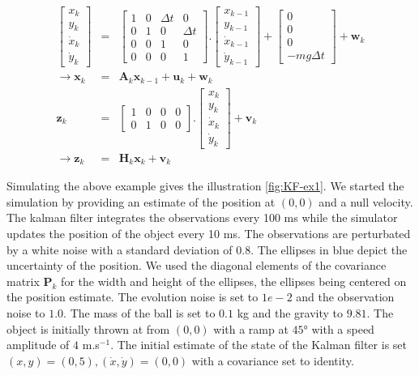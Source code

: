 \documentclass[10pt,oneside]{scrartcl}
\newcommand\vecteur[1]{\boldsymbol#1}
\newcommand\matrice[1]{\mathbf#1}
\begin{document}
\begin{eqnarray}
 \begin{bmatrix}
x_k \\
y_k\\
\dot{x}_k\\
\dot{y}_k
\end{bmatrix} &=& 
 \begin{bmatrix}
1 & 0 & \Delta t & 0        \\
0 & 1 & 0        & \Delta t \\
0 & 0 & 1        & 0 \\
0 & 0 & 0        & 1
\end{bmatrix} . 
 \begin{bmatrix}
x_{k-1} \\
y_{k-1}\\
\dot{x}_{k-1}\\
\dot{y}_{k-1}
\end{bmatrix} + 
 \begin{bmatrix}
0 \\
0\\
0\\
-m g \Delta t
\end{bmatrix} + \vecteur{w}_k \\
\rightarrow \vecteur{x}_k &=& \matrice{A}_k \vecteur{x}_{k-1} + \vecteur{u}_k + \vecteur{w}_k\\
\vecteur{z}_k
&=& \begin{bmatrix}
1 & 0 & 0 & 0 \\
0 & 1 & 0 & 0 
\end{bmatrix}.
\begin{bmatrix}
x_k \\
y_k\\
\dot{x}_k\\
\dot{y}_k
\end{bmatrix} + \vecteur{v}_k\\
\rightarrow \vecteur{z}_k &=& \matrice{H}_k \vecteur{x}_k + \vecteur{v}_k
\end{eqnarray}

Simulating the above example gives the illustration
\ref{fig:KF-ex1}. We started the simulation by providing an estimate
of the position at $(0,0)$ and a null velocity. The kalman filter
integrates the observations every 100 ms while the simulator updates
the position of the object every 10 ms. The observations are
perturbated by a white noise with a standard deviation of 0.8. The
ellipses in blue depict the uncertainty of the position. We used the
diagonal elements of the covariance matrix $\matrice{P_k}$ for the
width and height of the ellipses, the ellipses being centered on the
position estimate. The evolution noise is set to $1e-2$ and the
observation noise to $1.0$. The mass of the ball is set to $0.1$ kg
and the gravity to $9.81$. The object is initially thrown at from
$(0,0)$ with a ramp at $45°$ with a speed amplitude of $4$
m.s$^{-1}$. The initial estimate of the state of the Kalman filter is
set $(x,y) = (0,5), (\dot{x},\dot{y}) = (0,0)$ with a covariance set
to identity.
\end{document}
